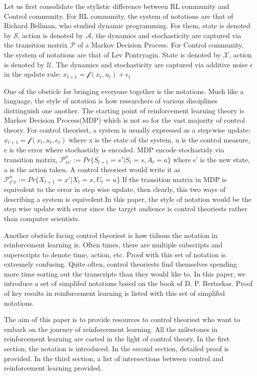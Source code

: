 \documentclass[journal]{IEEEtran}
\begin{document}
Let us first consolidate the stylistic difference between RL community and Control community. For RL community, the system of notations are that of Richard Bellman, who studied dynamic programming.  For them, state is denoted by $ \mathcal{S}$, action is denoted by $\mathcal{A} $, the dynamics and stochasticity are captured via the transition matrix $\mathcal{P}$ of a Markov Decision Process. For Control community, the system of notations are that of Lev Pontryagin. State is denoted by $\mathcal{X}$, action is denoted by $\mathcal{U}$. The dynamics and stochasticity are captured via additive noise $\epsilon$ in the update rule: $x_{t+1}=\mathcal{f}(x_t,u_t)+\epsilon_t$







One of the obsticle for bringing everyone together is the notations. Much like a language, the style of notation is how researchers of various disciplines disttinguish one another. The starting point of reinforcement learning theory is Markov Decision Process(MDP) which is not so for the vast majority of control theory. For control theoriest, a system is usually expressed as a step-wise update: $ x_{t+1} = \mathcal{f}(x_t,u_t,e_t)$ where x is the state of the system, u is the control measure, e is the error where stochastidy is encoded. MDP encode stochastidy via transition matrix,   $ \mathcal{P}_{ss'}^a := Pr\{S_{t+1}=s'|S_{t}=s,A_{t}=a\}$ where s' is the new state, a is the action taken. A control theoriest would write it as $ \mathcal{P}_{x'x}^u := Pr\{X_{t+1}=x'|X_{t}=x, U_{t}=u\}$ If the transition matrix in MDP is equivolent to the error in step wise update, then clearly, this two ways of describing a system is equivolent.In this paper, the style of notation would be the step wise update with error since the target audience is control theoriests rather than computer scientists.

Another obsticle facing control theoriest is how tidious the notation in reinforcement learning is. Often times, there are multiple subscripts and superscripts to denote time, action, etc. Proof with this set of notation is extremely confusing. Quite often, control theoriests find themselves spending more time sorting out the transcripts than they would like to. In this paper, we introduce a set of simplifed notations based on the book of D. P. Bertsekas. Proof of key results in reinforcement learning is listed with this set of simplifed notations.

The aim of this paper is to provide resources to control theoriest who want to embark on the journey of reinforcement learning. All the milestones in reinforcement learning are casted in the light of control theory. In the first section, the notation is introduced. In the second section, detailed proof is provided. In the third section, a list of intersections between control and reinforcement learning provided.
\end{document}
